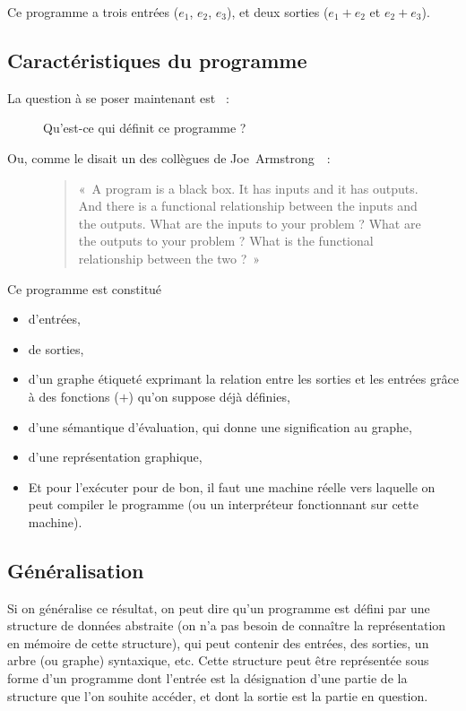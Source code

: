 \documentclass{article}
\begin{document}
Ce programme a trois entrées ($e_1$, $e_2$, $e_3$), et deux sorties ($e_1+e_2$ et $e_2+e_3$).

\subsection{Caractéristiques du programme}
La question à se poser maintenant est ~:
\begin{figure}[h!]
  \centering
  Qu'est-ce qui définit ce programme ?
\end{figure}

Ou, comme le disait un des collègues de Joe~Armstrong~\cite{what-are-the-inputs}\nocite{coders-at-work}~:

\begin{figure}[h!]
  \centering
  \begin{quotation}
    «~A program is a black box. It has inputs and it has outputs. And there is a functional relationship between the inputs and the outputs. What are the inputs to your problem ? What are the outputs to your problem ? What is the functional relationship between the two ?~»
  \end{quotation}
\end{figure}

Ce programme est constitué
\begin{itemize}
\item d'entrées,
\item de sorties,
\item d'un graphe étiqueté exprimant la relation entre les sorties et les entrées grâce à des fonctions ($+$) qu'on suppose déjà définies,
\item d'une sémantique d'évaluation, qui donne une signification au graphe,
\item d'une représentation graphique,
\item Et pour l'exécuter pour de bon, il faut une machine réelle vers laquelle on peut compiler le programme (ou un interpréteur fonctionnant sur cette machine).
\end{itemize}

\subsection{Généralisation}
Si on généralise ce résultat, on peut dire qu'un programme est défini par une structure de données abstraite (on n'a pas besoin de connaître la représentation en mémoire de cette structure), qui peut contenir des entrées, des sorties, un arbre (ou graphe) syntaxique, etc. Cette structure peut être représentée sous forme d'un programme dont l'entrée est la désignation d'une partie de la structure que l'on souhite accéder, et dont la sortie est la partie en question.
\end{document}
